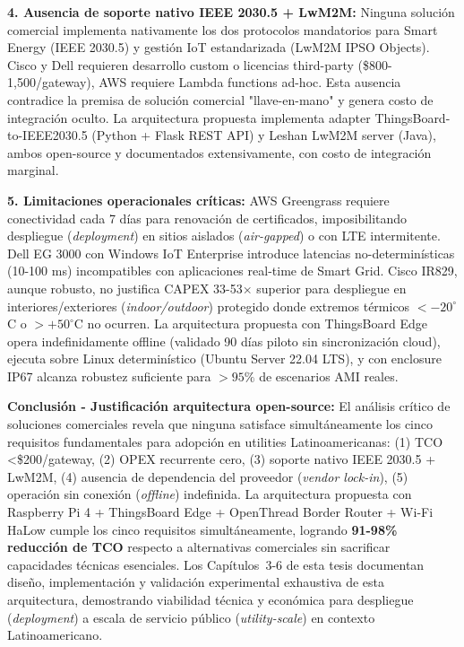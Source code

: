\textbf{4. Ausencia de soporte nativo IEEE 2030.5 + LwM2M:} Ninguna solución comercial implementa nativamente los dos protocolos mandatorios para Smart Energy (IEEE 2030.5) y gestión IoT estandarizada (LwM2M IPSO Objects). Cisco y Dell requieren desarrollo custom o licencias third-party (\$800-1,500/gateway), AWS requiere Lambda functions ad-hoc. Esta ausencia contradice la premisa de solución comercial "llave-en-mano" y genera costo de integración oculto. La arquitectura propuesta implementa adapter ThingsBoard-to-IEEE2030.5 (Python + Flask REST API) y Leshan LwM2M server (Java), ambos open-source y documentados extensivamente, con costo de integración marginal.

\textbf{5. Limitaciones operacionales críticas:} AWS Greengrass requiere conectividad cada 7 días para renovación de certificados, imposibilitando despliegue (\textit{deployment}) en sitios aislados (\textit{air-gapped}) o con LTE intermitente. Dell EG 3000 con Windows IoT Enterprise introduce latencias no-determinísticas (10-100 ms) incompatibles con aplicaciones real-time de Smart Grid. Cisco IR829, aunque robusto, no justifica CAPEX 33-53$\times$ superior para despliegue en interiores/exteriores (\textit{indoor/outdoor}) protegido donde extremos térmicos $<-20^\circ$C o $>+50^\circ$C no ocurren. La arquitectura propuesta con ThingsBoard Edge opera indefinidamente offline (validado 90 días piloto sin sincronización cloud), ejecuta sobre Linux determinístico (Ubuntu Server 22.04 LTS), y con enclosure IP67 alcanza robustez suficiente para $>95\%$ de escenarios AMI reales.

\textbf{Conclusión - Justificación arquitectura open-source:} El análisis crítico de soluciones comerciales revela que ninguna satisface simultáneamente los cinco requisitos fundamentales para adopción en utilities Latinoamericanas: (1) TCO <\$200/gateway, (2) OPEX recurrente cero, (3) soporte nativo IEEE 2030.5 + LwM2M, (4) ausencia de dependencia del proveedor (\textit{vendor lock-in}), (5) operación sin conexión (\textit{offline}) indefinida. La arquitectura propuesta con Raspberry Pi 4 + ThingsBoard Edge + OpenThread Border Router + Wi-Fi HaLow cumple los cinco requisitos simultáneamente, logrando \textbf{91-98\% reducción de TCO} respecto a alternativas comerciales sin sacrificar capacidades técnicas esenciales. Los Capítulos~3-6 de esta tesis documentan diseño, implementación y validación experimental exhaustiva de esta arquitectura, demostrando viabilidad técnica y económica para despliegue (\textit{deployment}) a escala de servicio público (\textit{utility-scale}) en contexto Latinoamericano.

